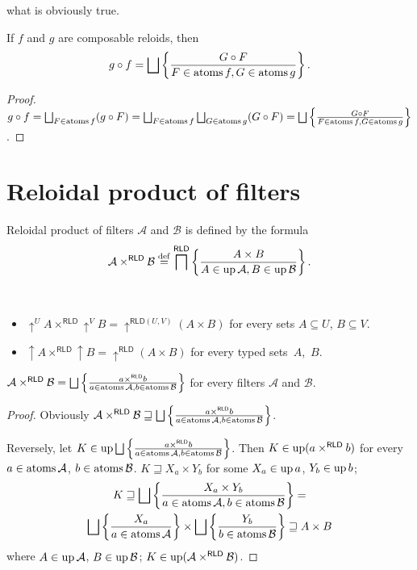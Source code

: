 what is obviously true.
\begin{cor}
\label{rld-comp-at}If $f$ and $g$ are composable reloids, then
\[
g\circ f=\bigsqcup\setcond{G\circ F}{F\in\atoms f,G\in\atoms g}.
\]
\end{cor}
\begin{proof}
$g\circ f=\bigsqcup_{F\in\atoms f}(g\circ F)=\bigsqcup_{F\in\atoms f}\bigsqcup_{G\in\atoms g}(G\circ F)=\bigsqcup\setcond{G\circ F}{F\in\atoms f,G\in\atoms g}$.
\end{proof}

\section{Reloidal product of filters}
\begin{defn}
Reloidal product of filters $\mathcal{A}$
and $\mathcal{B}$ is defined by the formula
\[
\mathcal{A}\times^{\mathsf{RLD}}\mathcal{B}\overset{\mathrm{def}}{=}\bigsqcap^{\mathsf{RLD}}\left\{ \frac{A\times B}{A\in\operatorname{up}\mathcal{A},B\in\operatorname{up}\mathcal{B}}\right\}.
\]
\end{defn}
\begin{obvious}
~
\begin{itemize}
\item $\uparrow^{U}A\times^{\mathsf{RLD}}\uparrow^{V}B=\uparrow^{\mathsf{RLD}(U,V)}(A\times B)$
for every sets $A\subseteq U$, $B\subseteq V$.
\item $\uparrow A\times^{\mathsf{RLD}}\uparrow B=\uparrow^{\mathsf{RLD}}(A\times B)$
for every typed sets~$A$,~$B$.\end{itemize}
\end{obvious}
\begin{thm}
\label{rld-prod-t-atoms}$\mathcal{A}\times^{\mathsf{RLD}}\mathcal{B}=\bigsqcup\setcond{a\times^{\mathsf{RLD}}b}{a\in\atoms\mathcal{A},b\in\atoms\mathcal{B}}$
for every filters $\mathcal{A}$ and $\mathcal{B}$.\end{thm}
\begin{proof}
Obviously $\mathcal{A}\times^{\mathsf{RLD}}\mathcal{B}\sqsupseteq\bigsqcup\setcond{a\times^{\mathsf{RLD}}b}{a\in\atoms\mathcal{A},b\in\atoms\mathcal{B}}$.

Reversely, let $K\in\up\bigsqcup\setcond{a\times^{\mathsf{RLD}}b}{a\in\atoms\mathcal{A},b\in\atoms\mathcal{B}}$.
Then $K\in\operatorname{up}(a\times^{\mathsf{RLD}}b)$ for every $a\in\operatorname{atoms}\mathcal{A}$,
$b\in\operatorname{atoms}\mathcal{B}$. $K\sqsupseteq X_{a}\times Y_{b}$ for some
$X_{a}\in\operatorname{up} a$, $Y_{b}\in\operatorname{up} b$; 
\begin{multline*}
K\sqsupseteq\bigsqcup\setcond{X_{a}\times Y_{b}}{a\in\atoms\mathcal{A},b\in\atoms\mathcal{B}}=\\
\bigsqcup\setcond{X_{a}}{a\in\atoms\mathcal{A}}\times\bigsqcup\setcond{Y_{b}}{b\in\atoms\mathcal{B}}\sqsupseteq A\times B
\end{multline*}
 where $A\in\operatorname{up}\mathcal{A}$, $B\in\operatorname{up}\mathcal{B}$; $K\in\operatorname{up}(\mathcal{A}\times^{\mathsf{RLD}}\mathcal{B})$.\end{proof}
